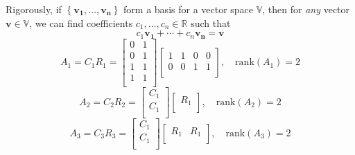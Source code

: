 \documentclass[a4paper]{article}
\begin{document}
Rigorously, if \(\left\{ \bm{v_{1}}, \ldots, \bm{v_{n}}\right\} \) form a basis for a vector space \(\mathbb{V}\), then for \textit{any} vector \(\bm{v} \in \mathbb{V}\), we can find coefficients \(c_{1}, \ldots, c_{n} \in \mathbb{R}\) such that
\[
	c_{1} \bm{v_{1}} + \cdots + c_{n} \bm{v_{n}} = \bm{v}
\]
\newpage
\[
	A_{1} = C_{1}R_{1} =
	\begin{bmatrix}
		0 & 1 \\
		0 & 1 \\
		1 & 1 \\
		1 & 1 \\
	\end{bmatrix}
	\begin{bmatrix}
		1 & 1 & 0 & 0 \\
		0 & 0 & 1 & 1 \\
	\end{bmatrix},
	\quad
	\text{rank}\!\left( A_{1} \right)  = 2
\]
\[
	A_{2} = C_{2} R_{2} = 
	\begin{bmatrix}
		C_{1} \\
		C_{1} \\
	\end{bmatrix}
	\begin{bmatrix}
		R_{1} \\
	\end{bmatrix},
	\quad
	\text{rank}\!\left( A_{2} \right) = 2
\]
\[
	A_{3} = C_{3}R_{3} =
	\begin{bmatrix}
		C_{1} \\
		C_{1} \\
	\end{bmatrix}
	\begin{bmatrix}
		R_{1} & R_{1} \\
	\end{bmatrix},
	\quad
	\text{rank}\!\left( A_{3} \right) = 2
\]
\end{document}
